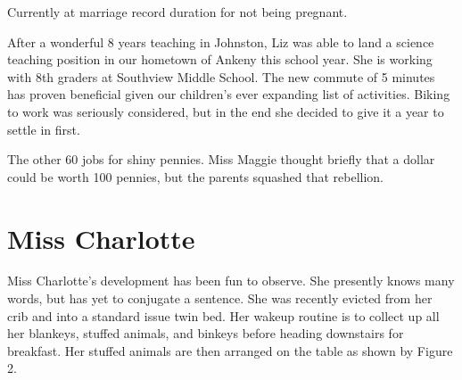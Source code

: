 \documentclass[letterpaper,11pt]{article}
\makeatletter
\newenvironment{figurehere}
  {\def\@captype{figure}}
  {}
\makeatother
\begin{document}
\begin{multicols}{2}
\begin{figurehere}
 \centering   
 \caption{Currently at marriage record duration for not being pregnant.}
\end{figurehere}

After a wonderful 8 years teaching in Johnston, Liz was able to land a
science teaching position in our hometown of Ankeny this school year. She is working
with 8th graders at Southview Middle School.  The new commute of 5 minutes
has proven beneficial given our children's ever expanding list of
activities.  Biking to work was seriously considered, but in the end she
decided to give it a year to settle in first.

The other 60%
jobs for shiny pennies.  Miss Maggie thought briefly that a dollar could be
worth 100 pennies, but the parents squashed that rebellion.

\section{Miss Charlotte}

Miss Charlotte's development has been fun to observe.  She presently knows many
words, but has yet to conjugate a sentence.  She was recently evicted from her
crib and into a standard issue twin bed.  Her wakeup routine is
to collect up all her blankeys, stuffed animals, and binkeys before heading
downstairs for breakfast.  Her stuffed animals are then arranged on the table
as shown by Figure 2.


\end{multicols}
\end{document}
